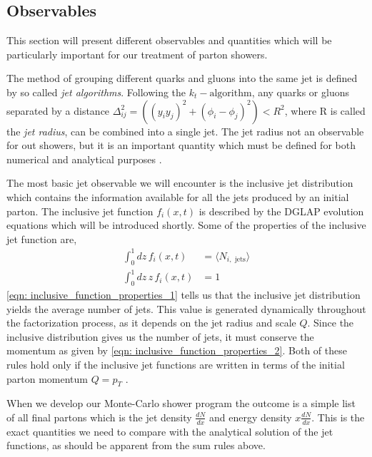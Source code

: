 \documentclass[main.tex]{subfiles}
\begin{document}
\subsection{Observables}
This section will present different observables and quantities which will be particularly important for our treatment of parton showers.

The method of grouping different quarks and gluons into the same jet is defined by so called \textit{jet algorithms}. Following the \(k_t-\text{algorithm}\), any quarks or gluons separated by a distance \(\Delta_{ij}^2 = ((y_iy_j)^2+(\phi_i-\phi_j)^2) < R^2\), where R is called the \textit{jet radius}, can be combined into a single jet. The jet radius not an observable for out showers, but it is an important quantity which must be defined for both numerical and analytical purposes \cite{Dasgupta_2015}. 

The most basic jet observable we will encounter is the inclusive jet distribution which contains the information available for all the jets produced by an initial parton. The inclusive jet function \(f_i(x,t)\) is described by the DGLAP evolution equations which will be introduced shortly. Some of the properties of the inclusive jet function are, 
\begin{align}
    \int_0^1 dz\, f_i(x,t) &= \langle N_{i, \text{ jets}}\rangle  \label{eqn: inclusive_function_properties_1}\\
    \int_0^1 dz\, z\,  f_i(x,t) &= 1 \label{eqn: inclusive_function_properties_2}
\end{align}
\autoref{eqn: inclusive_function_properties_1} tells us that the inclusive jet distribution yields the average number of jets. This value is generated dynamically throughout the factorization process, as it depends on the jet radius and scale \(Q\). Since the inclusive distribution gives us the number of jets, it must conserve the momentum as given by \autoref{eqn: inclusive_function_properties_2}. Both of these rules hold only if the inclusive jet functions are written in terms of the initial parton momentum \(Q=p_T\) \cite{Neill_2021}.

When we develop our Monte-Carlo shower program the outcome is a simple list of all final partons which is the jet density \(\frac{dN}{dx}\) and energy density \(x \frac{dN}{dx}\). This is the exact quantities we need to compare with the analytical solution of the jet functions, as should be apparent from the sum rules above.
\end{document}
